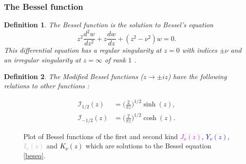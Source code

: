 \documentclass[12pt]{article}
\newtheorem{mydef1}{Definition}[section]
\numberwithin{figure}{section}
\numberwithin{equation}{section}
\numberwithin{table}{section}
\begin{document}
\subsubsection{The Bessel function}
\begin{mydef1}
The Bessel function is the solution to Bessel's equation
\begin{equation}
z^2\frac{d^2w}{dz^2}+z\frac{dw}{dz}+(z^2-\nu^2)w=0.\label{beseq}
\end{equation}
This differential equation has a regular singularity at $z=0$ with indices $\pm\nu$ and an irregular singularity at $z=\infty$ of rank $1$ \cite[\S10.2(i)]{DLMF}.
\end{mydef1}
\begin{mydef1}
The Modified Bessel functions ($z\rightarrow\pm iz$) have the following relations to other functions \cite[\S10.39]{DLMF}:

\begin{subequations}
\begin{align}
\mathcal{I}_{1/2}(z)&=\bigg(\frac{2}{\pi z}\bigg)^{1/2}\sinh(z),\\
\mathcal{I}_{-1/2}(z)&=\bigg(\frac{2}{\pi z}\bigg)^{1/2}\cosh(z).
\end{align}
\end{subequations}
\end{mydef1}
\begin{figure}[H]
\centering
{}
\caption{Plot of Bessel functions of the first and second kind \textcolor{magenta}{$J_\nu(z)$}, \textcolor{blue}{$Y_\nu(z)$}, \textcolor{Plum}{$I_\nu(z)$} and \textcolor{black}{$K_\nu(z)$} which are solutions to the Bessel equation \eqref{beseq}.}
\end{figure}
\end{document}
